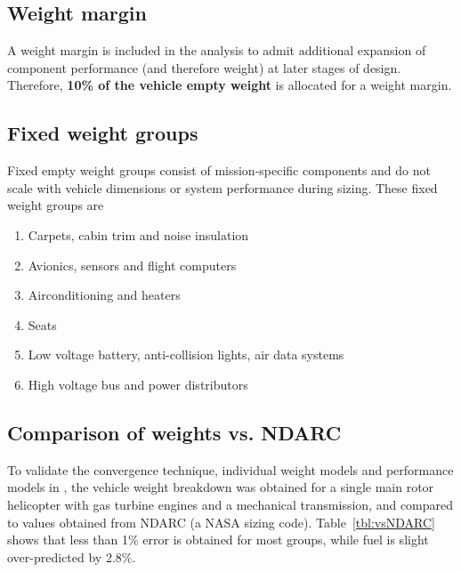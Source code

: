 \subsection{Weight margin}
A weight margin is included in the analysis to admit additional expansion of component performance (and therefore weight) at later stages of design. Therefore, \textbf{10\% of the vehicle empty weight} is allocated for a weight margin. 

\subsection{Fixed weight groups}
Fixed empty weight groups consist of mission-specific components and do not scale with vehicle dimensions or system performance during sizing. These fixed weight groups are 
\begin{enumerate}
\item Carpets, cabin trim and noise insulation
\item Avionics, sensors and flight computers
\item Airconditioning and heaters
\item Seats
\item Low voltage battery, anti-collision lights, air data systems 
\item High voltage bus and power distributors
\end{enumerate}

\subsection{Comparison of weights vs. NDARC}
To validate the convergence technique, individual weight models and performance models in \hydra, the vehicle weight breakdown was obtained for a single main rotor helicopter with gas turbine engines and a mechanical transmission, and compared to values obtained from NDARC (a NASA sizing code). Table~\ref{tbl:vsNDARC} shows that less than 1\% error is obtained for most groups, while fuel is slight over-predicted by 2.8\%. 

